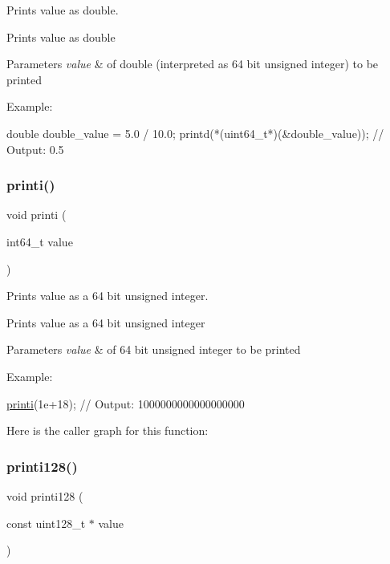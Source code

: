 Prints value as double. 

Prints value as double 
\begin{DoxyParams}{Parameters}
{\em value} & of double (interpreted as 64 bit unsigned integer) to be printed\\
\hline
\end{DoxyParams}
Example\+: 
\begin{DoxyCode}
\textcolor{keywordtype}{double} double\_value = 5.0 / 10.0;
printd(*(uint64\_t*)(&double\_value)); \textcolor{comment}{// Output: 0.5}
\end{DoxyCode}
 \mbox{\label{group__consolecapi_gaac924af668edbf421d478edf203fdbd1}} 
\subsubsection{\texorpdfstring{printi()}{printi()}}
{\footnotesize\ttfamily void printi (\begin{DoxyParamCaption}\item[{int64\+\_\+t}]{value }\end{DoxyParamCaption})}



Prints value as a 64 bit unsigned integer. 

Prints value as a 64 bit unsigned integer 
\begin{DoxyParams}{Parameters}
{\em value} & of 64 bit unsigned integer to be printed\\
\hline
\end{DoxyParams}
Example\+: 
\begin{DoxyCode}
\mbox{\hyperlink{group__consolecapi_gaac924af668edbf421d478edf203fdbd1}{printi}}(1e+18); \textcolor{comment}{// Output: 1000000000000000000}
\end{DoxyCode}
 Here is the caller graph for this function\+:
\mbox{\label{group__consolecapi_ga0ac41ae1c31cf87a4adc14d9edb3e6a5}} 
\subsubsection{\texorpdfstring{printi128()}{printi128()}}
{\footnotesize\ttfamily void printi128 (\begin{DoxyParamCaption}\item[{const uint128\+\_\+t $\ast$}]{value }\end{DoxyParamCaption})}



